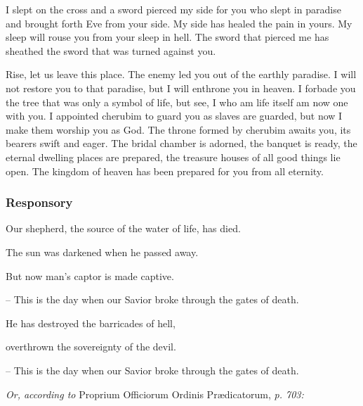 I slept on the cross and a sword pierced my side for you who slept in paradise and brought forth Eve from your side. My side has healed the pain in yours. My sleep will rouse you from your sleep in hell. The sword that pierced me has sheathed the sword that was turned against you.

Rise, let us leave this place. The enemy led you out of the earthly paradise. I will not restore you to that paradise, but I will enthrone you in heaven. I forbade you the tree that was only a symbol of life, but see, I who am life itself am now one with you. I appointed cherubim to guard you as slaves are guarded, but now I make them worship you as God. The throne formed by cherubim awaits you, its bearers swift and eager. The bridal chamber is adorned, the banquet is ready, the eternal dwelling places are prepared, the treasure houses of all good things lie open. The kingdom of heaven has been prepared for you from all eternity.

\subsubsection{Responsory}

\hfill

\noindent Our shepherd, the source of the water of life, has died.\par
\noindent The sun was darkened when he passed away.\par
\noindent But now man’s captor is made captive.\par
\noindent – This is the day when our Savior broke through the gates of death.

\vspace{5pt}

\noindent He has destroyed the barricades of hell,\par
\noindent overthrown the sovereignty of the devil.\par
\noindent – This is the day when our Savior broke through the gates of death.

\vspace{5pt}

\textit{Or, according to} Proprium Officiorum Ordinis Prædicatorum, \textit{p. 703:}
